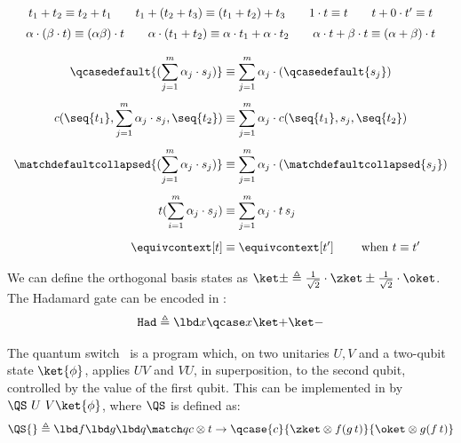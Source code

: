 \begingroup
\renewcommand\displaystyle\textstyle
\newcommand\sep{\\[1.25ex]}
\begin{table}[t]
  \centering
  \[
    \begin{array}{c}
      t_1 + t_2 \equiv t_2 + t_1
      \qquad
      t_1 + (t_2 + t_3) \equiv (t_1 + t_2) + t_3
      \qquad
      1 \cdot t \equiv t
      \qquad
      t + 0 \cdot t' \equiv t
      \sep
      \alpha \cdot (\beta \cdot t) \equiv (\alpha \beta) \cdot t
      \qquad
      \alpha \cdot (t_1 + t_2) \equiv \alpha \cdot t_1 + \alpha \cdot t_2
      \qquad
      \alpha \cdot t + \beta \cdot t \equiv (\alpha + \beta) \cdot t
      \\[1.2em]
      \begin{aligned}
        \qcasedefault {(\sum_{j=1}^m \alpha_j \cdot s_j)} &\equiv
        \sum_{j=1}^m \alpha_j \cdot (\qcasedefault{s_j})
        \sep
        c(\seq{t_1}, \sum_{j=1}^m \alpha_j \cdot s_j,
        \seq{t_2}) &\equiv \sum_{j=1}^m \alpha_j \cdot
        c(\seq{t_1}, s_j, \seq{t_2})
        \sep
        \matchdefaultcollapsed{(\sum_{j=1}^m \alpha_j \cdot s_j)}
        &\equiv \sum_{j=1}^m \alpha_j \cdot (\matchdefaultcollapsed{s_j})
        \sep
        t(\sum_{i=1}^m \alpha_j \cdot s_j) &\equiv \sum_{j=1}^m
        \alpha_j \cdot t\,s_j
        \sep
        \equivcontext[t] &\equiv \equivcontext[t'] \qquad \text{ when
        } t \equiv t'
      \end{aligned}
    \end{array}
  \]
  \caption{Equivalence relation $\equiv\ \subseteq\ \text{Terms}
  \times \text{Terms}$}
  \label{tab:equiv}
\end{table}

\endgroup

\begin{example}
  \label{ex:had-syntax}
  We can define the orthogonal basis states as $\ket \pm \triangleq
  \frac{1}{\sqrt 2} \cdot \zket \pm \frac{1}{\sqrt 2} \cdot \oket$. The
  Hadamard gate can be encoded in \hyrql{}:
  \[
    \mathtt{Had} \triangleq \lbd x \qcase x {\ket +} {\ket -}
  \]
\end{example}

\begin{example}
  \label{ex:qs-syntax}
  The quantum switch~\cite{CAPV13} is a program which, on two unitaries $U, V$
  and a two-qubit state $\ket{\phi}$, applies $UV$ and $VU$, in superposition,
  to the second qubit, controlled by the value of the first qubit. This can be
  implemented in \hyrql{} by $\QS\ U\ V \ket{\phi}$, where $\QS$ is defined as:
  \[
    \QS{} \triangleq\lbd f\lbd g\lbd q \match q { c \otimes t \to
      \qcase{c}{\zket \otimes f(g\,t)}{ \oket \otimes g(f\,t)}
    }
  \]
\end{example}


